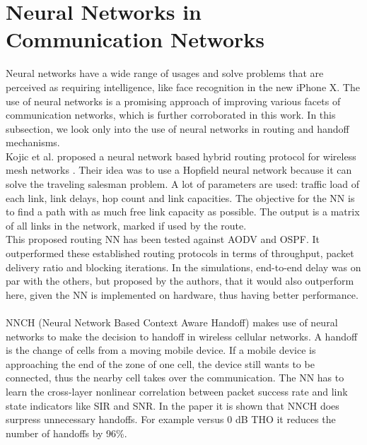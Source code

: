 \section{Neural Networks in Communication Networks}
\label{sec:rel_nn}
Neural networks have a wide range of usages and solve problems that are perceived as requiring intelligence, like face recognition in the new iPhone X. The use of neural networks is a promising approach of improving various facets of communication networks, which is further corroborated in this work. In this subsection, we look only into the use of neural networks in routing and handoff mechanisms. \\
Kojic et al. proposed a neural network based hybrid routing protocol for wireless mesh networks \cite{nnwmn}. Their idea was to use a Hopfield neural network because it can solve the traveling salesman problem. A lot of parameters are used: traffic load of each link, link delays, hop count and link capacities. The objective for the \gls{NN} is to find a path with as much free link capacity as possible. The output is a matrix of all links in the network, marked if used by the route. \\
This proposed routing \gls{NN} has been tested against \gls{AODV} and \gls{OSPF}. It outperformed these established routing protocols in terms of throughput, packet delivery ratio and blocking iterations. In the simulations, end-to-end delay was on par with the others, but proposed by the authors, that it would also outperform here, given the \gls{NN} is implemented on hardware, thus having better performance. 
\\\\
NNCH (Neural Network Based Context Aware Handoff) \cite{nnhandoff} makes use of neural networks to make the decision to handoff in wireless cellular networks. A handoff is the change of cells from a moving mobile device. If a mobile device is approaching the end of the zone of one cell, the device still wants to be connected, thus the nearby cell takes over the communication. The NN has to learn the cross-layer nonlinear correlation between packet success rate and link state indicators like \gls{SIR} and \gls{SNR}. In the paper it is shown that NNCH does surpress unnecessary handoffs. For example versus 0 dB \gls{THO} it reduces the number of handoffs by 96\%.


